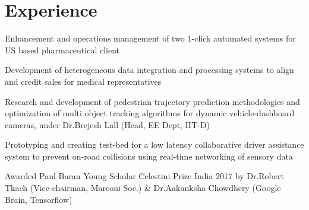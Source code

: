 \documentclass[]{deedy-resume-openfont}
\begin{document}
\hfill\vline\hfill
\begin{minipage}[t]{0.60\textwidth} 

\vspace{-0.07in}
\section{Experience}
\vspace{\topsep}
\begin{tightemize}\item Enhancement and operations management of two 1-click automated systems for US based pharmaceutical client
\item Development of heterogeneous data integration and processing systems to align and credit sales for medical representatives
\end{tightemize}
\sectionsep

\begin{tightemize}\item Research and development of pedestrian trajectory prediction methodologies and optimization of multi object tracking algorithms for dynamic vehicle-dashboard cameras, under
Dr.Brejesh Lall (Head, EE Dept, IIT-D)
\end{tightemize}
\sectionsep

\begin{tightemize}
\item Prototyping and creating test-bed for a low latency collaborative driver assistance system to prevent on-road collisions using real-time networking of sensory data
\item Awarded Paul Baran Young Scholar Celestini Prize India 2017 by Dr.Robert Tkach (Vice-chairman, Marconi Soc.) \& Dr.Aakanksha Chowdhery (Google Brain, Tensorflow)
\end{tightemize}

\sectionsep

\hline

\end{minipage}
\end{document}
